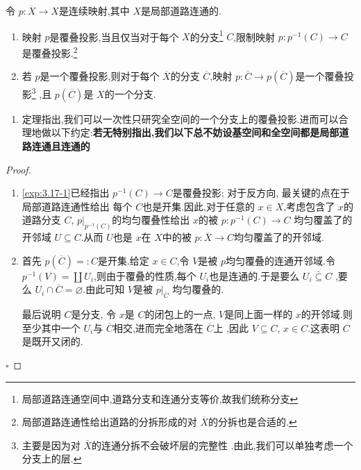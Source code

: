 \documentclass[../../几何与拓扑.tex]{subfiles}
\begin{document}
\begin{theorem}
    令 \(  p: \overline{X}\to X  \)是连续映射,其中 \(  X  \)是局部道路连通的.
    \begin{enumerate}
        \item 映射 \(  p  \)是覆叠投影,当且仅当对于每个  \(  X  \)的分支\footnote{局部道路连通空间中,道路分支和连通分支等价,故我们统称分支} \(  C  \),限制映射 \(  p: p ^{-1} \left( C \right)\to C   \)是覆叠投影.\footnote{局部道路连通性给出道路的分拆形成的对 \(  \overline{X}  \)的分拆也是合适的. }
        \item 若 \(  p  \)是一个覆叠投影,则对于每个 \(  \overline{X}  \)的分支 \(  \overline{C}  \),映射 \(  p: \overline{C}\to p\left( \overline{C} \right)   \)是一个覆叠投影\footnote{主要是因为对 \(  \overline{X}  \)的连通分拆不会破坏层的完整性 .由此,我们可以单独考虑一个分支上的层.} ,且 \(  p\left( \overline{C} \right)   \)是 \(  X  \)的一个分支. 
    \end{enumerate}
      
\end{theorem}
\begin{remark}
    \begin{enumerate}
        \item 定理指出,我们可以一次性只研究全空间的一个分支上的覆叠投影.进而可以合理地做以下约定:\textbf{若无特别指出,我们以下总不妨设基空间和全空间都是局部道路连通且连通的}
    \end{enumerate}
    
\end{remark}
\begin{proof}
    \begin{enumerate}
        \item \ref{exp:3.17-1}已经指出 \(  p  ^{-1} \left( C \right)\to C   \)是覆叠投影;
        对于反方向, 最关键的点在于局部道路连通性给出 每个 \(  C  \)也是开集.因此,对于任意的 \(  x \in X  \),考虑包含了 \(  x  \)的道路分支 \(  C  \), \(  p|_{p ^{-1}  \left( C \right) }  \)的均匀覆叠性给出  \(  x  \)的被 \(  p: p ^{-1} \left( C \right)\to C   \)       均匀覆盖了的开邻域 \(  U \subseteq C  \).从而 \(  U  \)也是 \(  x  \)在 \(  X  \)中的被 \(  p: \overline{X}\to C  \)均匀覆盖了的开邻域.     
        \item 首先 \(  p\left( \overline{C} \right) =  :C   \)是开集.给定 \(  x \in C  \),令 \(  V  \)是被 \(  p  \)均匀覆叠的连通开邻域.令 \(  p ^{-1} \left( V \right)=  \coprod  U_{i}   \),则由于覆叠的性质,每个 \(  U_{i}  \)也是连通的.于是要么 \(  U_{i}\bar{\subseteq}C  \)       ,要么 \(  U_{i}\cap  \overline{C}= \varnothing  \).由此可知 \(  V  \)是被 \(  p|_{\overline{C}}  \)   均匀覆叠的.
        
        最后说明 \(  C  \)是分支, 令 \(  x  \)是 \(  C  \)的闭包上的一点, \(  V  \)是同上面一样的 \(  x  \)的开邻域.则至少其中一个 \(  U_{i}  \)与 \(  \overline{C}  \)相交,进而完全地落在 \(  \overline{C}  \)上    ,因此 \(  V\subseteq C  \), \(  x \in C  \).这表明 \(  C  \)是既开又闭的.   
    \end{enumerate}
    

    \hfill $\square$
\end{proof}
\end{document}
